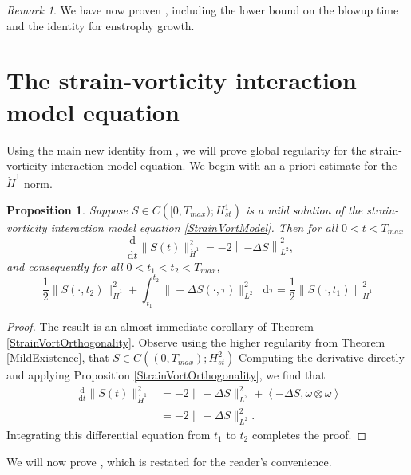 \documentclass[11pt]{article}
\theoremstyle{plain}
\newtheorem{proposition}[theorem]{Proposition}
\theoremstyle{remark}
\newtheorem{remark}[theorem]{Remark}
\numberwithin{equation}{section}
\newcommand{\diff}{\mathop{}\!\mathrm{d}}
\begin{document}
\begin{remark}
    We have now proven , including the lower bound on the blowup time and the identity for enstrophy growth.
\end{remark}



\section{The strain-vorticity interaction model equation} \label{InteractionModel}

Using the main new identity from , we will prove global regularity for the strain-vorticity interaction model equation. We begin with an a priori estimate for the $\dot{H}^1$ norm.

\begin{proposition} \label{H1Control}
    Suppose $S\in C\left([0,T_{max});H^1_{st}\right)$ is a mild solution of the strain-vorticity interaction model equation \eqref{StrainVortModel}. Then for all $0<t<T_{max}$
    \begin{equation}
\frac{\diff}{\diff t} 
\|S(t)\|_{\dot{H}^1}^2=
-2\left\|-\Delta S\right\|_{L^2}^2,
    \end{equation}
and consequently for all $0<t_1<t_2<T_{max}$,
\begin{equation}
    \frac{1}{2}\|S(\cdot,t_2)\|_{\dot{H}^1}^2+
    \int_{t_1}^{t_2}\|-\Delta S(\cdot,\tau)\|_{L^2}^2 \diff\tau
    =
    \frac{1}{2}\left\|S(\cdot,t_1)\right\|_{\dot{H}^1}^2
\end{equation}
\end{proposition}

\begin{proof}
The result is an almost immediate corollary of Theorem \ref{StrainVortOrthogonality}.
Observe using the higher regularity from Theorem \ref{MildExistence}, that
$S\in C\left((0,T_{max});H^2_{st}\right)$
Computing the derivative directly and applying Proposition \ref{StrainVortOrthogonality}, we find that
\begin{align}
    \frac{\diff}{\diff t}
    \|S(t)\|_{\dot{H}^1}^2
    &=
    -2\|-\Delta S\|_{L^2}^2 +\left<-\Delta S,
    \omega\otimes\omega \right>\\
    &=
    -2\|-\Delta S\|_{L^2}^2.
\end{align}
Integrating this differential equation from $t_1$ to $t_2$ completes the proof.
\end{proof}


We will now prove , which is restated for the reader's convenience.
\end{document}
